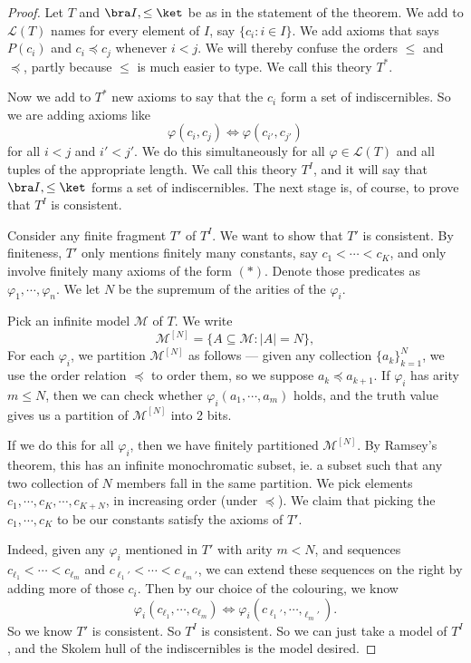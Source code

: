 \documentclass[a4paper]{article}
\begin{document}
\begin{proof}
  Let $T$ and $\bra I, \leq \ket$ be as in the statement of the theorem. We add to $\mathcal{L}(T)$ names for every element of $I$, say $\{c_i: i \in I\}$. We add axioms that says $P(c_i)$ and $c_i \preccurlyeq c_j$ whenever $i < j$. We will thereby confuse the orders $\leq$ and $\preccurlyeq$, partly because $\leq$ is much easier to type. We call this theory $T^*$.

  Now we add to $T^*$ new axioms to say that the $c_i$ form a set of indiscernibles. So we are adding axioms like
  \[
    \varphi(c_i, c_j) \Leftrightarrow \varphi(c_{i'}, c_{j'})\tag{$*$}
  \]
  for all $i < j$ and $i' < j'$. We do this simultaneously for all $\varphi \in \mathcal{L}(T)$ and all tuples of the appropriate length. We call this theory $T^I$, and it will say that $\bra I, \leq\ket$ forms a set of indiscernibles. The next stage is, of course, to prove that $T^I$ is consistent.

  Consider any finite fragment $T'$ of $T^I$. We want to show that $T'$ is consistent. By finiteness, $T'$ only mentions finitely many constants, say $c_1 < \cdots < c_K$, and only involve finitely many axioms of the form $(*)$. Denote those predicates as $\varphi_1, \cdots, \varphi_n$. We let $N$ be the supremum of the arities of the $\varphi_i$.

  Pick an infinite model $\mathcal{M}$ of $T$. We write
  \[
    \mathcal{M}^{[N]} = \{A \subseteq \mathcal{M}: |A| = N\},
  \]
  For each $\varphi_i$, we partition $\mathcal{M}^{[N]}$ as follows --- given any collection $\{a_k\}_{k = 1}^N$, we use the order relation $\preccurlyeq$ to order them, so we suppose $a_k \preccurlyeq a_{k + 1}$. If $\varphi_i$ has arity $m \leq N$, then we can check whether $\varphi_i(a_1, \cdots, a_m)$ holds, and the truth value gives us a partition of $\mathcal{M}^{[N]}$ into 2 bits.

  If we do this for all $\varphi_i$, then we have finitely partitioned $\mathcal{M}^{[N]}$. By Ramsey's theorem, this has an infinite monochromatic subset, ie. a subset such that any two collection of $N$ members fall in the same partition. We pick elements $c_1, \cdots, c_K, \cdots, c_{K + N}$, in increasing order (under $\preccurlyeq$). We claim that picking the $c_1, \cdots, c_K$ to be our constants satisfy the axioms of $T'$.

  Indeed, given any $\varphi_i$ mentioned in $T'$ with arity $m < N$, and sequences $c_{\ell_1} < \cdots < c_{\ell_m}$ and $c_{\ell_1'} < \cdots < c_{\ell_m'}$, we can extend these sequences on the right by adding more of those $c_i$. Then by our choice of the colouring, we know
  \[
    \varphi_i(c_{\ell_1}, \cdots, c_{\ell_m}) \Leftrightarrow \varphi_i(c_{\ell_1'}, \cdots, _{\ell_m'}).
  \]
  So we know $T'$ is consistent. So $T^I$ is consistent. So we can just take a model of $T^I$, and the Skolem hull of the indiscernibles is the model desired.
\end{proof}
\end{document}
